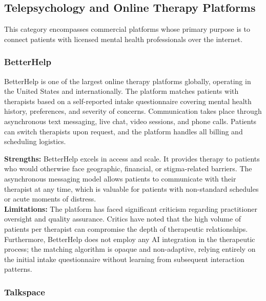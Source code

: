 \subsection{Telepsychology and Online Therapy Platforms}
\label{subsec:telepsych}

This category encompasses commercial platforms whose primary purpose is to
connect patients with licensed mental health professionals over the internet.

\subsubsection{BetterHelp}

BetterHelp is one of the largest online therapy platforms globally, operating in
the United States and internationally. The platform matches patients with
therapists based on a self-reported intake questionnaire covering mental health
history, preferences, and severity of concerns. Communication takes place
through asynchronous text messaging, live chat, video sessions, and phone calls.
Patients can switch therapists upon request, and the platform handles all billing
and scheduling logistics.

\begin{tcolorbox}[colback=lightgray, colframe=accentblue, title=\textbf{BetterHelp — Assessment}, fonttitle=\bfseries, sharp corners=south]
  \textbf{Strengths:} BetterHelp excels in access and scale. It provides therapy
  to patients who would otherwise face geographic, financial, or stigma-related
  barriers. The asynchronous messaging model allows patients to communicate with
  their therapist at any time, which is valuable for patients with non-standard
  schedules or acute moments of distress. \\[4pt]
  \textbf{Limitations:} The platform has faced significant criticism regarding
  practitioner oversight and quality assurance. Critics have noted that the high
  volume of patients per therapist can compromise the depth of therapeutic
  relationships. Furthermore, BetterHelp does not employ any AI integration in
  the therapeutic process; the matching algorithm is opaque and non-adaptive,
  relying entirely on the initial intake questionnaire without learning from
  subsequent interaction patterns.
\end{tcolorbox}

\subsubsection{Talkspace}

